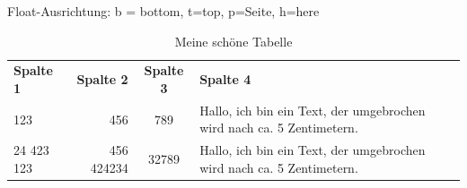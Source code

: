 \documentclass[12pt,ngerman,parskip=half]{scrartcl}
\begin{document}
Float-Ausrichtung: b = bottom, t=top, p=Seite, h=here

\begin{table}[H]
\caption{Meine schöne Tabelle}\label{tab:erste}
\begin{center}
\begin{tabular}{lrcp{5cm}} \toprule[2pt]
\textbf{Spalte 1} & {\bfseries Spalte 2}  & \textbf{Spalte 3}  & \textbf{Spalte 4}  \\ \cmidrule[1pt](rl){1-4}
123 & 456 & 789  & Hallo, ich bin ein Text, der umgebrochen wird nach ca. 5 Zentimetern. \\ \midrule
24 423 123 & 456 424234 &  32789  & Hallo, ich bin ein Text, der umgebrochen wird nach ca. 5 Zentimetern. \\ \bottomrule[2pt]
\end{tabular} 
\end{center}
\end{table}

\blindtext

\blindtext

\blindtext
\end{document}
